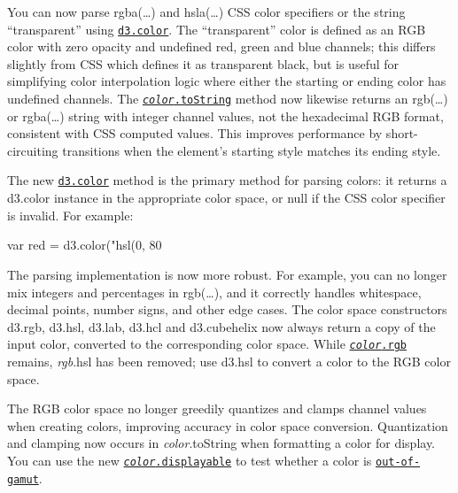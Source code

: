 You can now parse rgba(…) and hsla(…) C\+SS color specifiers or the string “transparent” using \href{https://github.com/d3/d3-color/blob/master/README.md#color}{\tt d3.\+color}. The “transparent” color is defined as an R\+GB color with zero opacity and undefined red, green and blue channels; this differs slightly from C\+SS which defines it as transparent black, but is useful for simplifying color interpolation logic where either the starting or ending color has undefined channels. The \href{https://github.com/d3/d3-color/blob/master/README.md#color_toString}{\tt {\itshape color}.to\+String} method now likewise returns an rgb(…) or rgba(…) string with integer channel values, not the hexadecimal R\+GB format, consistent with C\+SS computed values. This improves performance by short-\/circuiting transitions when the element’s starting style matches its ending style.

The new \href{https://github.com/d3/d3-color/blob/master/README.md#color}{\tt d3.\+color} method is the primary method for parsing colors\+: it returns a d3.\+color instance in the appropriate color space, or null if the C\+SS color specifier is invalid. For example\+:


\begin{DoxyCode}
var red = d3.color("hsl(0, 80%
\end{DoxyCode}


The parsing implementation is now more robust. For example, you can no longer mix integers and percentages in rgb(…), and it correctly handles whitespace, decimal points, number signs, and other edge cases. The color space constructors d3.\+rgb, d3.\+hsl, d3.\+lab, d3.\+hcl and d3.\+cubehelix now always return a copy of the input color, converted to the corresponding color space. While \href{https://github.com/d3/d3-color/blob/master/README.md#color_rgb}{\tt {\itshape color}.rgb} remains, {\itshape rgb}.hsl has been removed; use d3.\+hsl to convert a color to the R\+GB color space.

The R\+GB color space no longer greedily quantizes and clamps channel values when creating colors, improving accuracy in color space conversion. Quantization and clamping now occurs in {\itshape color}.to\+String when formatting a color for display. You can use the new \href{https://github.com/d3/d3-color/blob/master/README.md#color_displayable}{\tt {\itshape color}.displayable} to test whether a color is \href{https://en.wikipedia.org/wiki/Gamut}{\tt out-\/of-\/gamut}.

